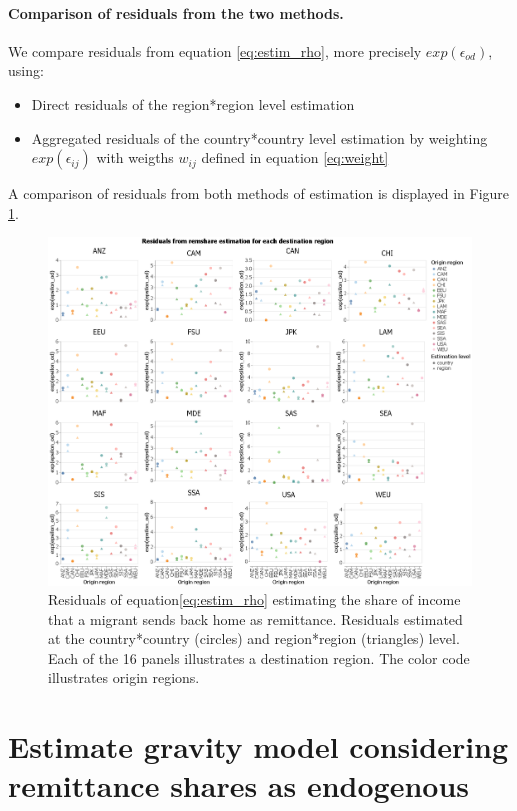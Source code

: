 \documentclass[letterpaper,11pt]{article}
\begin{document}
\paragraph{Comparison of residuals from the two methods.} We compare residuals from equation \ref{eq:estim_rho}, more precisely $exp(\epsilon_{od})$, using:
\begin{itemize}
	\item Direct residuals of the region*region level estimation
	\item Aggregated residuals of the country*country level estimation by weighting $exp(\epsilon_{ij})$ with weigths $w_{ij}$ defined in equation \ref{eq:weight}
\end{itemize}

A comparison of residuals from both methods of estimation is displayed in Figure \ref{epsilon}.

\begin{figure}[H]
	\centering
	\includegraphics[width=\textwidth]{exp_epsilon_countryregion.png}
	\caption{Residuals of equation\ref{eq:estim_rho} estimating the share of income that a migrant sends back home as remittance. Residuals estimated at the country*country (circles) and region*region (triangles) level. Each of the 16 panels illustrates a destination region. The color code illustrates origin regions.}
	\label{epsilon}
\end{figure}


\section{Estimate gravity model considering remittance shares as endogenous}
\end{document}
